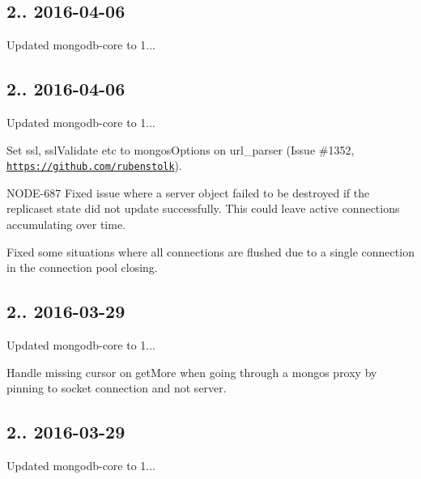 \subsection*{2.. 2016-\/04-\/06 }


\begin{DoxyItemize}
\item Updated mongodb-\/core to 1...
\end{DoxyItemize}

\subsection*{2.. 2016-\/04-\/06 }


\begin{DoxyItemize}
\item Updated mongodb-\/core to 1...
\item Set ssl, ssl\+Validate etc to mongos\+Options on url\+\_\+parser (Issue \#1352, \href{https://github.com/rubenstolk}{\tt https\+://github.\+com/rubenstolk}).
\item N\+O\+D\+E-\/687 Fixed issue where a server object failed to be destroyed if the replicaset state did not update successfully. This could leave active connections accumulating over time.
\item Fixed some situations where all connections are flushed due to a single connection in the connection pool closing.
\end{DoxyItemize}

\subsection*{2.. 2016-\/03-\/29 }


\begin{DoxyItemize}
\item Updated mongodb-\/core to 1...
\item Handle missing cursor on get\+More when going through a mongos proxy by pinning to socket connection and not server.
\end{DoxyItemize}

\subsection*{2.. 2016-\/03-\/29 }


\begin{DoxyItemize}
\item Updated mongodb-\/core to 1...
\end{DoxyItemize}

